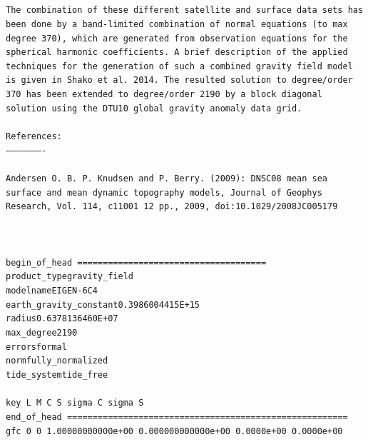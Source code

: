 \documentclass[a4paper, 12pt]{book}
\begin{document}
\texttt{\\
\\
\noindent The combination of these different satellite and surface data sets 
has been done by a~band-limited combination of normal equations (to max degree 
370), which are generated from observation equations for the spherical harmonic 
coefficients. A~brief description of the applied techniques for the generation 
of such a~combined gravity field model is given in Shako et al. 2014. The 
resulted solution to degree/order 370 has been extended to degree/order 2190 by 
a~block diagonal solution using the DTU10 global gravity anomaly data grid.
\\
\\
\noindent References:\\
\noindent ----------------------
\\
\\
\noindent Andersen O. B. P. Knudsen and P. Berry. (2009): DNSC08 mean sea 
surface and mean dynamic topography models, Journal of Geophys Research, 
Vol. 114, c11001 12 pp., 2009, doi:10.1029/2008JC005179
\\
\\
\noindent [...]
\\
\\
\noindent begin\_of\_head =====================================\\
\noindent product\_type\phantom{***************}gravity\_field\\
\noindent modelname\phantom{******************}EIGEN-6C4\\
\noindent earth\_gravity\_constant\phantom{*****}0.3986004415E+15\\
\noindent radius\phantom{*********************}0.6378136460E+07\\
\noindent max\_degree\phantom{*****************}2190\\
\noindent errors\phantom{*********************}formal\\
\noindent norm\phantom{***********************}fully\_normalized\\
\noindent tide\_system\phantom{****************}tide\_free\\
\\
\noindent key    L    M \phantom{-}C \phantom{-------------------------------}S 
\phantom{----------------------------------}sigma C   \phantom{------}sigma S\\
\noindent end\_of\_head 
=======================================================\\
\noindent gfc    0    0  \phantom{-}1.00000000000e+00 0.000000000000e+00 0.0000e+00 0.0000e+00\\
}
\end{document}
